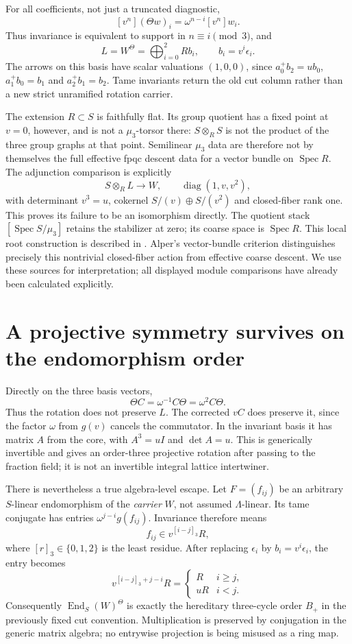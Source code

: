 For all coefficients, not just a truncated diagnostic,
\[
 [v^n](\Theta w)_i=\omega^{n-i}[v^n]w_i.
\]
Thus invariance is equivalent to support in $n\equiv i\pmod3$, and
\[
 L=W^\Theta=\bigoplus_{i=0}^2 Rb_i,\qquad b_i=v^i\epsilon_i.
\]
The arrows on this basis have scalar valuations $(1,0,0)$, since $a_0^+b_2=ub_0$, $a_1^+b_0=b_1$ and $a_2^+b_1=b_2$. Tame invariants return the old cut column rather than a new strict unramified rotation carrier.

The extension $R\subset S$ is faithfully flat. Its group quotient has a fixed point at $v=0$, however, and is not a $\mu_3$-torsor there: $S\otimes_R S$ is not the product of the three group graphs at that point. Semilinear $\mu_3$ data are therefore not by themselves the full effective fpqc descent data for a vector bundle on $\operatorname{Spec}R$. The adjunction comparison is explicitly
\[
 S\otimes_R L\longrightarrow W,\qquad
 \operatorname{diag}(1,v,v^2),
\]
with determinant $v^3=u$, cokernel $S/(v)\oplus S/(v^2)$ and closed-fiber rank one. This proves its failure to be an isomorphism directly. The quotient stack $[\operatorname{Spec}S/\mu_3]$ retains the stabilizer at zero; its coarse space is $\operatorname{Spec}R$. This local root construction is described in \cite{RootStackGuide}. Alper's vector-bundle criterion \cite[Theorem10.3, pp.2386--2387]{AlperDescent} distinguishes precisely this nontrivial closed-fiber action from effective coarse descent. We use these sources for interpretation; all displayed module comparisons have already been calculated explicitly.

\section{A projective symmetry survives on the endomorphism order}
Directly on the three basis vectors,
\[
 \Theta C=\omega^{-1}C\Theta=\omega^2C\Theta.
\]
Thus the rotation does not preserve $L$. The corrected $vC$ does preserve it, since the factor $\omega$ from $g(v)$ cancels the commutator. In the invariant basis it has matrix $A$ from the core, with $A^3=uI$ and $\det A=u$. This is generically invertible and gives an order-three projective rotation after passing to the fraction field; it is not an invertible integral lattice intertwiner.

There is nevertheless a true algebra-level escape. Let $F=(f_{ij})$ be an arbitrary $S$-linear endomorphism of the \emph{carrier} $W$, not assumed $\Lambda$-linear. Its tame conjugate has entries $\omega^{j-i}g(f_{ij})$. Invariance therefore means
\[
 f_{ij}\in v^{[i-j]_3}R,
\]
where $[r]_3\in\{0,1,2\}$ is the least residue. After replacing $\epsilon_i$ by $b_i=v^i\epsilon_i$, the entry becomes
\[
 v^{[i-j]_3+j-i}R=
 \begin{cases}R&i\ge j,\\uR&i<j.\end{cases}
\]
Consequently $\operatorname{End}_S(W)^\Theta$ is exactly the hereditary three-cycle order $B_+$ in the previously fixed cut convention. Multiplication is preserved by conjugation in the generic matrix algebra; no entrywise projection is being misused as a ring map.

